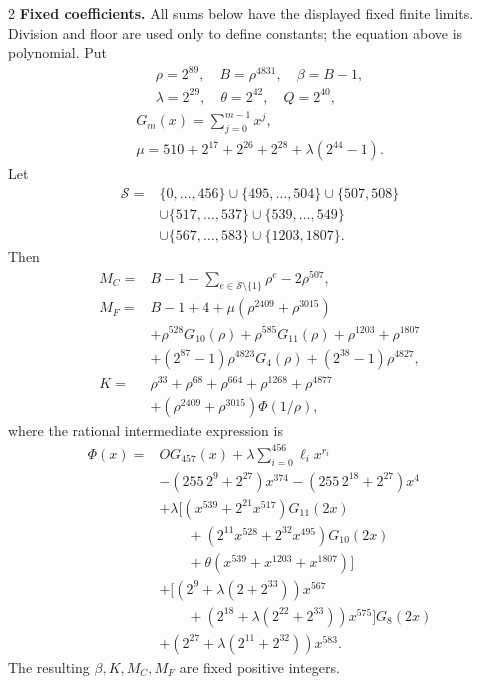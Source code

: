 \documentclass[10pt]{article}
\let\bigsum\sum
\renewcommand{\sum}{\bigsum\nolimits}
\newcommand{\rng}[2]{\{#1,\ldots,#2\}}
\begin{document}
\begin{multicols}{2}
\textbf{Fixed coefficients.}
All sums below have the displayed fixed finite limits. Division and
floor are used only to define constants; the equation above is polynomial.
Put
\[
\begin{gathered}
\rho=2^{89},\quad B=\rho^{4831},\quad\beta=B-1,\\
\lambda=2^{29},\quad\theta=2^{42},\quad Q=2^{40},
\end{gathered}
\]
\[
\begin{gathered}
G_m(x)=\sum_{j=0}^{m-1}x^j,\\
\mu=510+2^{17}+2^{26}+2^{28}+\lambda(2^{44}-1).
\end{gathered}
\]
Let
\begin{align*}
\mathcal S={}&\rng0{456}\cup\rng{495}{504}\cup\{507,508\}\\
 &\cup\rng{517}{537}\cup\rng{539}{549}\\
 &\cup\rng{567}{583}\cup\{1203,1807\}.
\end{align*}
Then
\begin{align*}
M_C={}&B-1-\sum_{e\in\mathcal S\setminus\{1\}}\rho^e-2\rho^{507},\\
M_F={}&B-1+4+\mu(\rho^{2409}+\rho^{3015})\\
 &+\rho^{528}G_{10}(\rho)+\rho^{585}G_{11}(\rho)+\rho^{1203}+\rho^{1807}\\
 &+(2^{87}-1)\rho^{4823}G_4(\rho)+(2^{38}-1)\rho^{4827},\\
K={}&\rho^{33}+\rho^{68}+\rho^{664}+\rho^{1268}+\rho^{4877}\\
 &+(\rho^{2409}+\rho^{3015})\Phi(1/\rho),
\end{align*}
where the rational intermediate expression is
\begin{align*}
\Phi(x)={}&O G_{457}(x)+\lambda\sum_{i=0}^{456}\ell_i x^{r_i}\\
 &-(255\,2^9+2^{27})x^{374}-(255\,2^{18}+2^{27})x^4\\
 &+\lambda\bigl[(x^{539}+2^{21}x^{517})G_{11}(2x)\\
 &\qquad +(2^{11}x^{528}+2^{32}x^{495})G_{10}(2x)\\
 &\qquad +\theta(x^{539}+x^{1203}+x^{1807})\bigr]\\
 &+\bigl[(2^9+\lambda(2+2^{33}))x^{567}\\
 &\qquad +(2^{18}+\lambda(2^{22}+2^{33}))x^{575}\bigr]G_8(2x)\\
 &+(2^{27}+\lambda(2^{11}+2^{32}))x^{583}.
\end{align*}
The resulting $\beta,K,M_C,M_F$ are fixed positive integers.


\end{multicols}
\end{document}
